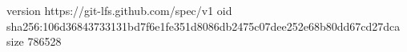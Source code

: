 version https://git-lfs.github.com/spec/v1
oid sha256:106d36843733131bd7f6e1fe351d8086db2475c07dee252e68b80dd67cd27dca
size 786528
